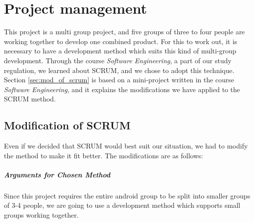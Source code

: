 \chapter{Project management}
This project is a multi group project, and five groups of three to four people are working together to develop one combined product. For this to work out, it is necessary to have a development method which suits this kind of multi-group development. Through the course \textit{Software Engineering}, a part of our study regulation, we learned about SCRUM, and we chose to adopt this technique.\\
Section \ref{sec:mod_of_scrum} is based on a mini-project written in the course \textit{Software Engineering}, and it explains the modifications we have applied to the SCRUM method.

\section{Modification of SCRUM}
Even if we decided that SCRUM would best suit our situation, we had to modify the method to make it fit better. The modifications are as follows:

\paragraph{Arguments for Chosen Method}
Since this project requires the entire android group to be split into smaller groups of 3-4 people, we are going to use a development method which supports small groups working together.

